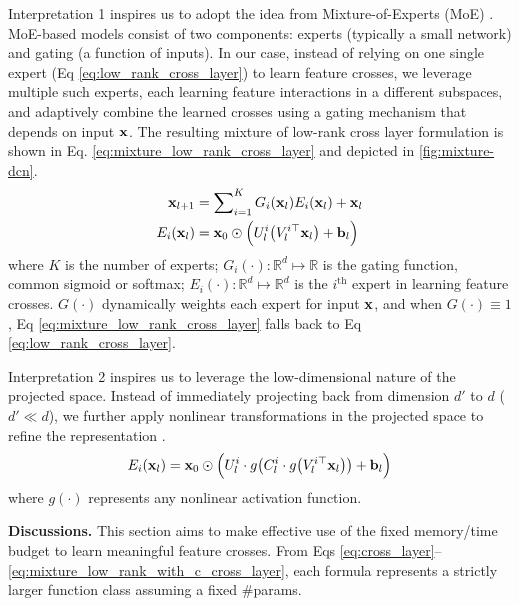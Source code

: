 \documentclass[sigconf]{acmart}
\newcommand{\vecx}{{\bf x}}
\newcommand{\vecb}{{\bf b}}
\begin{document}
Interpretation 1 inspires us to adopt the idea from Mixture-of-Experts (MoE) \cite{shazeer2017outrageously, jacobs1991adaptive, eigen2013learning, ma2018modeling}. MoE-based models consist of two components: experts (typically a small network) and gating (a function of inputs). In our case, instead of relying on one single expert (Eq \eqref{eq:low_rank_cross_layer}) to learn feature crosses, we leverage multiple such experts, each learning feature interactions in a different subspaces, and adaptively combine the learned crosses using a gating mechanism that depends on input $\vecx$. The resulting mixture of low-rank cross layer formulation is shown in Eq. \eqref{eq:mixture_low_rank_cross_layer} and depicted in \autoref{fig:mixture-dcn}.
\begin{equation}
\label{eq:mixture_low_rank_cross_layer}
    \begin{split}
	\vecx_{l+1} &= \sum\nolimits_{i=1}^K G_i(\vecx_l) E_i(\vecx_l) + \vecx_l \\
	E_i(\vecx_l) &= \vecx_0 \odot \Big(U_l^i \big(V_l^{i\top}\vecx_l \big)  + \vecb_l \Big )
	\end{split}
\end{equation}
where $K$ is the number of experts; $G_i(\cdot): \mathbb{R}^d \mapsto \mathbb{R}$ is the gating function, common sigmoid or softmax; $E_i(\cdot): \mathbb{R}^d \mapsto \mathbb{R}^d$ is the $i^\text{th}$ expert in learning feature crosses. $G(\cdot)$ dynamically weights each expert for input $\vecx$, and when $G(\cdot) \equiv 1$, Eq \eqref{eq:mixture_low_rank_cross_layer} falls back to Eq \eqref{eq:low_rank_cross_layer}. 

Interpretation 2 inspires us to leverage the low-dimensional nature of the projected space. Instead of immediately projecting back from dimension $d'$ to $d$ ($d' \ll d$), we further apply nonlinear transformations in the projected space to refine the representation \cite{fan2019multiscale}.\begin{equation}
\label{eq:mixture_low_rank_with_c_cross_layer}
E_i(\vecx_l) = \vecx_0 \odot \Big(
	U_l^i \cdot g \big( C_l^i \cdot g\big(V_l^{i\top}\vecx_l \big) \big)  + \vecb_l 
	\Big )
\end{equation}
where $g(\cdot)$ represents any nonlinear activation function. 

{\bf Discussions.} This section aims to make effective use of the fixed memory/time budget to learn meaningful feature crosses. From Eqs \eqref{eq:cross_layer}--\eqref{eq:mixture_low_rank_with_c_cross_layer}, each formula represents a strictly larger function class assuming a fixed \#params. 
\end{document}
